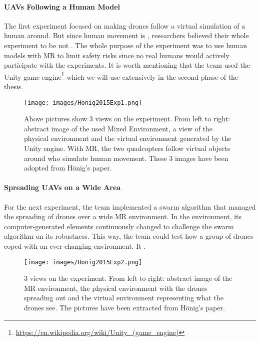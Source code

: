 \paragraph{UAVs Following a Human Model}
The first experiment\cite{hoenig2015mixed} focused on making drones follow a virtual simulation of a human around. But since human movement is , researchers believed their whole experiment to be not . The whole purpose of the experiment was to use human models with MR to limit safety risks since no real humans would actively participate with the experiments. It is worth mentioning that the team used the Unity game engine\footnote{\protect\url{https://en.wikipedia.org/wiki/Unity\_(game\_engine)}} which we will use extensively in the second phase of the thesis.
\begin{figure}[!htb]
	\texttt{[image: images/Honig2015Exp1.png]}
	\centering
	\caption{Above pictures show 3 views on the experiment. From left to right: abstract image of the used Mixed Environment, a view of the physical environment and the virtual environment generated by the Unity engine. With MR, the two quadcopters follow virtual objects around who simulate human movement. These 3 images have been adopted from H\"{o}nig's paper\cite{hoenig2015mixed}.}
\end{figure}

\paragraph{Spreading UAVs on a Wide Area}
For the next experiment, the team implemented a swarm algorithm that managed the spreading of drones over a wide MR environment. In the environment, its computer-generated elements continuously changed to challenge the swarm algorithm on its robustness. This way, the team could test how a group of drones coped with an ever-changing environment. It . 

\begin{figure}[!htb]
	\texttt{[image: images/Honig2015Exp2.png]}
	\centering
	\caption{3 views on the experiment. From left to right: abstract image of the MR environment, the physical environment with the drones spreading out and the virtual environment representing what the drones see. The pictures have been extracted from H\"{o}nig's paper\cite{hoenig2015mixed}.}
\end{figure}

